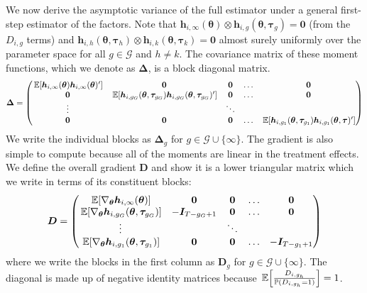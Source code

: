 \documentclass[12pt]{article}
\begin{document}
We now derive the asymptotic variance of the full estimator under a general first-step estimator of the factors. Note that $\bm h_{i, \infty}(\bm{\theta}) \otimes \bm h_{i, g}(\bm{\theta}, \bm \tau_g) = \bm 0$ (from the $D_{i,g}$ terms) and $\bm h_{i, h}(\bm{\theta}, \bm \tau_h) \otimes \bm h_{i, k}(\bm{\theta}, \bm \tau_k) = \bm 0$ almost surely uniformly over the parameter space for all $g \in \mathcal{G}$ and $h \neq k$. The covariance matrix of these moment functions, which we denote as $\bm \Delta$, is a block diagonal matrix.
\begin{equation*}
    \bm \Delta =
    \begin{pmatrix}
        \expec{\bm h_{i, \infty}(\bm{\theta}) \bm h_{i, \infty}(\bm{\theta})'} & \bm 0 & \bm 0 & \hdots & \bm 0\\
        \bm 0 &  \expec{\bm h_{i, g_G}(\bm{\theta}, \bm \tau_{g_G}) \bm h_{i, g_G}(\bm{\theta}, \bm \tau_{g_G})' } & \bm 0 & \hdots & \bm 0\\
        \vdots & & \ddots  &\\
        \bm 0 & \bm 0 & \bm 0 & \hdots & \expec{ \bm h_{i, g_1}(\bm{\theta}, \bm \tau_{g_1}) \bm h_{i, g_1}(\bm{\theta}, \bm \tau)'}
    \end{pmatrix}
\end{equation*}
We write the individual blocks as $\bm \Delta_g$ for $g \in \mathcal{G} \cup \{ \infty \}$. The gradient is also simple to compute because all of the moments are linear in the treatment effects. We define the overall gradient $\bm D$ and show it is a lower triangular matrix which we write in terms of its constituent blocks:
\begin{equation*}
    \bm D = 
    \begin{pmatrix}
        \expec{\nabla_{\bm{\theta}} \bm h_{i, \infty}(\bm{\theta}) } & \bm 0 & \bm 0 & \hdots & \bm 0\\
        \expec{\nabla_{\bm{\theta}} \bm h_{i, g_G}(\bm{\theta}, \bm \tau_{g_G})} & -\bm I_{T - g_G + 1} & \bm 0 & \hdots & \bm 0\\
        \vdots & & \ddots  &\\
        \expec{\nabla_{\bm{\theta}} \bm h_{i, g_1}(\bm{\theta}, \bm \tau_{g_1})} & \bm 0 & \bm 0 & \hdots & -\bm I_{T - g_1 + 1}
    \end{pmatrix}
\end{equation*}
where we write the blocks in the first column as $\bm D_g$ for $g \in \mathcal{G} \cup \{ \infty \}$. The diagonal is made up of negative identity matrices because $\expec{\frac{D_{i, g_h}}{\mathbb{P}(D_{i,g_h} = 1)}} = 1$.
\end{document}
